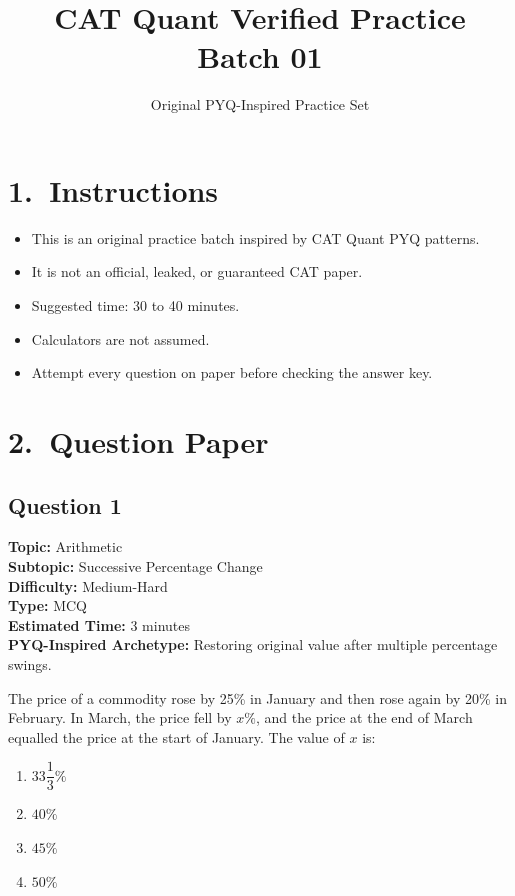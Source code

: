 \documentclass[11pt]{article}
\begin{document}
\title{CAT Quant Verified Practice Batch 01}
\author{Original PYQ-Inspired Practice Set}
\date{}
\maketitle

\section*{1.\ Instructions}
\begin{itemize}
\item This is an original practice batch inspired by CAT Quant PYQ patterns.
\item It is not an official, leaked, or guaranteed CAT paper.
\item Suggested time: 30 to 40 minutes.
\item Calculators are not assumed.
\item Attempt every question on paper before checking the answer key.
\end{itemize}

\section*{2.\ Question Paper}

\subsection*{Question 1}
\textbf{Topic:} Arithmetic \\
\textbf{Subtopic:} Successive Percentage Change \\
\textbf{Difficulty:} Medium-Hard \\
\textbf{Type:} MCQ \\
\textbf{Estimated Time:} 3 minutes \\
\textbf{PYQ-Inspired Archetype:} Restoring original value after multiple percentage swings.

\begin{tcolorbox}
The price of a commodity rose by 25\% in January and then rose again by 20\% in February. In March, the price fell by \(x\%\), and the price at the end of March equalled the price at the start of January. The value of \(x\) is:
\end{tcolorbox}
\begin{enumerate}[label=(\Alph*)]
\item \(33\dfrac{1}{3}\%\)
\item \(40\%\)
\item \(45\%\)
\item \(50\%\)
\end{enumerate}
\end{document}
